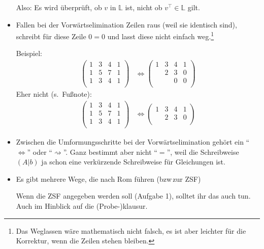\documentclass[11pt, a4paper]{article}
\newcommand{\Lsg}{\mathbb{L}}
\begin{document}
\begin{itemize}
Also: Es wird überprüft, ob $v$ in $\Lsg$ ist, nicht ob $v^\intercal \in \Lsg$ gilt.

\item Fallen bei der Vorwärtselimination Zeilen raus (weil sie identisch sind), schreibt für diese Zeile $0 = 0$ und lasst diese nicht einfach weg.\footnote{Das Weglassen wäre mathematisch nicht falsch, es ist aber leichter für die Korrektur, wenn die Zeilen stehen bleiben.} 

Beispiel:
\begin{align*}
\left(
\begin{array}{ccc|c}
1 & 3 & 4 & 1\\
1 & 5 & 7 & 1\\
1 & 3 & 4 & 1\\
\end{array}
\right)
&
\Leftrightarrow
\left(
\begin{array}{ccc|c}
1 & 3 & 4 & 1\\
  & 2 & 3 & 0\\
  &   & 0 & 0\\
\end{array}
\right)
\end{align*}
Eher nicht (s.\, Fußnote): 
\begin{align*}
\left(
\begin{array}{ccc|c}
1 & 3 & 4 & 1\\
1 & 5 & 7 & 1\\
1 & 3 & 4 & 1\\
\end{array}
\right)
&
\Leftrightarrow
\left(
\begin{array}{ccc|c}
1 & 3 & 4 & 1\\
  & 2 & 3 & 0\\
\end{array}
\right)
\end{align*}

\item Zwischen die Umformungsschritte bei der Vorwärtselimination gehört ein \enquote{$\Leftrightarrow$} oder \enquote{$\rightsquigarrow$}. Ganz bestimmt aber nicht \enquote{$=$}, weil die Schreibweise $\left(A|b\right)$ ja schon eine verkürzende Schreibweise für Gleichungen ist. 

\item Es gibt mehrere Wege, die nach Rom führen (bzw\,zur ZSF) \smiley{}

Wenn die ZSF angegeben werden soll (Aufgabe 1), solltet ihr das auch tun. Auch im Hinblick auf die (Probe-)klausur.


\end{itemize}
\end{document}
